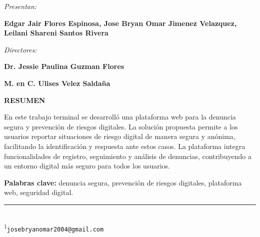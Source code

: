 \begin{titlepage}
\begin{center}
			{\fontsize{14}{16}\selectfont \textit{Presentan:}\par}
			\vspace{0.15cm}
			{\fontsize{14}{16}\selectfont \textbf{Edgar Jair Flores Espinosa, Jose Bryan Omar Jimenez Velazquez, Leilani Shareni Santos Rivera}\par}
			
			\vspace{1.35cm}
			
			{\fontsize{14}{16}\selectfont \textit{Directores:}\par}
			
			\vspace{0.45cm}
			
			{\fontsize{14}{16}\selectfont \textbf{Dr. Jessie Paulina Guzman Flores}\par}
			{\fontsize{14}{16}\selectfont \textbf{M. en C. Ulises Velez Saldaña}\par}
						
			\vspace{1.1cm}
			
			{\fontsize{14}{16}\selectfont \textbf{RESUMEN}\par}
			
		\end{center}
		
		\vspace{0.25cm}
		
		{\fontsize{12}{14}\selectfont
			En este trabajo terminal se desarrolló una plataforma web para la denuncia segura y prevención de riesgos digitales. La solución propuesta permite a los usuarios reportar situaciones de riesgo digital de manera segura y anónima, facilitando la identificación y respuesta ante estos casos. La plataforma integra funcionalidades de registro, seguimiento y análisis de denuncias, contribuyendo a un entorno digital más seguro para todos los usuarios.
			\par}
		
		\vspace{0.35cm}
		
		{\fontsize{12}{14}\selectfont
			\textbf{Palabras clave:} denuncia segura, prevención de riesgos digitales, plataforma web, seguridad digital.
			\par}
		
		\vfill
		
		{\fontsize{12}{14}\selectfont
			\rule{6cm}{0.4pt}\\[-0.05cm]
			\textsuperscript{1}\texttt{josebryanomar2004@gmail.com}
		}
		
	\end{titlepage}
